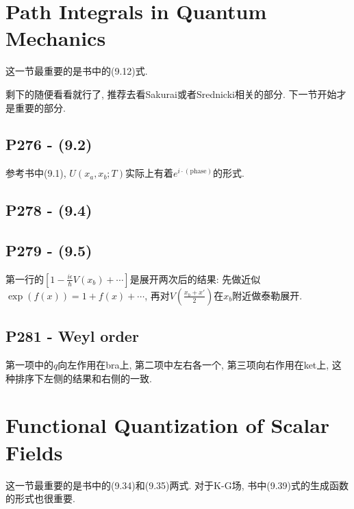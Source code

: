 \documentclass[10pt,b5paper,openany]{book}
\begin{document}
\section{Path Integrals in Quantum Mechanics}

这一节最重要的是书中的(9.12)式. 

剩下的随便看看就行了, 推荐去看Sakurai或者Srednicki相关的部分. 下一节开始才是重要的部分. 

\subsection{P276 - (9.2)}

参考书中(9.1), $U(x_a, x_b; T)$实际上有着$e^{i \cdot (\text{phase})}$的形式. 

\subsection{P278 - (9.4)}

\begin{center}
\end{center}

\subsection{P279 - (9.5)}

第一行的$[1-\frac{i\epsilon}{\hbar}V(x_b)+\cdots]$是展开两次后的结果: 先做近似$\exp(f(x)) = 1 + f(x) + \cdots$, 再对$V(\frac{x_b + x'}{2})$在$x_b$附近做泰勒展开.  

\subsection{P281 - Weyl order}

第一项中的$q$向左作用在bra上, 第二项中左右各一个, 第三项向右作用在ket上, 这种排序下左侧的结果和右侧的一致. 

\section{Functional Quantization of Scalar Fields}

这一节最重要的是书中的(9.34)和(9.35)两式. 对于K-G场, 书中(9.39)式的生成函数的形式也很重要. 
\end{document}
